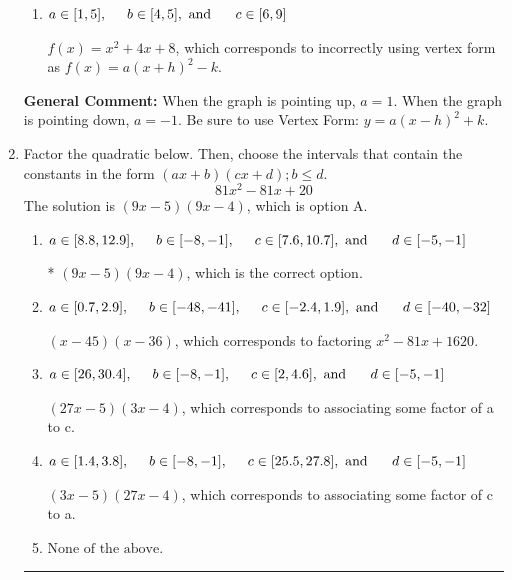 \documentclass{extbook}[14pt]
\newcommand{\litem}[1]{\item #1

\rule{\textwidth}{0.4pt}}
\begin{document}
\begin{enumerate}
{\begin{enumerate}[label=\Alph*.]
* $f(x)=x^{2} -4 x$, which is the correct option.
\item \( a \in [1, 5], \hspace*{5mm} b \in [4, 5], \text{ and } \hspace*{5mm} c \in [6, 9] \)

$f(x)=x^{2} +4 x + 8$, which corresponds to incorrectly using vertex form as $f(x) = a(x+h)^2 - k$.
\end{enumerate}

\textbf{General Comment:} When the graph is pointing up, $a=1$. When the graph is pointing down, $a=-1$. Be sure to use Vertex Form: $y = a(x-h)^2+k$.
}
\litem{
Factor the quadratic below. Then, choose the intervals that contain the constants in the form $(ax+b)(cx+d); b \leq d.$
\[ 81x^{2} -81 x + 20 \]The solution is \( (9x -5)(9x -4) \), which is option A.\begin{enumerate}[label=\Alph*.]
\item \( a \in [8.8, 12.9], \hspace*{5mm} b \in [-8, -1], \hspace*{5mm} c \in [7.6, 10.7], \text{ and } \hspace*{5mm} d \in [-5, -1] \)

* $(9x -5)(9x -4)$, which is the correct option.
\item \( a \in [0.7, 2.9], \hspace*{5mm} b \in [-48, -41], \hspace*{5mm} c \in [-2.4, 1.9], \text{ and } \hspace*{5mm} d \in [-40, -32] \)

 $(x -45)(x -36)$, which corresponds to factoring $x^{2} -81 x + 1620$.
\item \( a \in [26, 30.4], \hspace*{5mm} b \in [-8, -1], \hspace*{5mm} c \in [2, 4.6], \text{ and } \hspace*{5mm} d \in [-5, -1] \)

 $(27x -5)(3x -4)$, which corresponds to associating some factor of a to c.
\item \( a \in [1.4, 3.8], \hspace*{5mm} b \in [-8, -1], \hspace*{5mm} c \in [25.5, 27.8], \text{ and } \hspace*{5mm} d \in [-5, -1] \)

 $(3x -5)(27x -4)$, which corresponds to associating some factor of c to a.
\item \( \text{None of the above.} \)


\end{enumerate}}
\end{enumerate}
\end{document}
